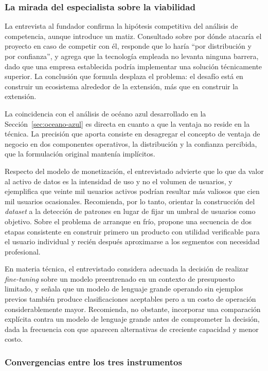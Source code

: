 \subsubsection{La mirada del especialista sobre la viabilidad}

La entrevista al fundador confirma la hipótesis competitiva del análisis de competencia, aunque introduce un matiz. Consultado sobre por dónde atacaría el proyecto en caso de competir con él, responde que lo haría \enquote{por distribución y por confianza}, y agrega que la tecnología empleada no levanta ninguna barrera, dado que una empresa establecida podría implementar una solución técnicamente superior. La conclusión que formula desplaza el problema: el desafío está en construir un ecosistema alrededor de la extensión, más que en construir la extensión.

La coincidencia con el análisis de océano azul desarrollado en la Sección~\ref{sec:oceano-azul} es directa en cuanto a que la ventaja no reside en la técnica. La precisión que aporta consiste en desagregar el concepto de ventaja de negocio en dos componentes operativos, la distribución y la confianza percibida, que la formulación original mantenía implícitos.

Respecto del modelo de monetización, el entrevistado advierte que lo que da valor al activo de datos es la intensidad de uso y no el volumen de usuarios, y ejemplifica que veinte mil usuarios activos podrían resultar más valiosos que cien mil usuarios ocasionales. Recomienda, por lo tanto, orientar la construcción del \textit{dataset} a la detección de patrones en lugar de fijar un umbral de usuarios como objetivo. Sobre el problema de arranque en frío, propone una secuencia de dos etapas consistente en construir primero un producto con utilidad verificable para el usuario individual y recién después aproximarse a los segmentos con necesidad profesional.

En materia técnica, el entrevistado considera adecuada la decisión de realizar \textit{fine-tuning} sobre un modelo preentrenado en un contexto de presupuesto limitado, y señala que un modelo de lenguaje grande operando sin ejemplos previos también produce clasificaciones aceptables pero a un costo de operación considerablemente mayor. Recomienda, no obstante, incorporar una comparación explícita contra un modelo de lenguaje grande antes de comprometer la decisión, dada la frecuencia con que aparecen alternativas de creciente capacidad y menor costo.

\subsubsection{Convergencias entre los tres instrumentos}

